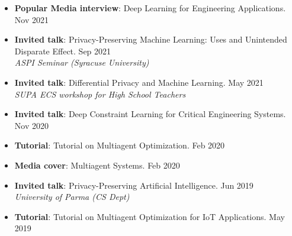 \begin{itemize}
  \item {\bf Popular Media interview}: {Deep Learning for Engineering Applications.} \hfill {Nov 2021}\\ 

  \item \textbf{Invited talk}: Privacy-Preserving Machine Learning: Uses and Unintended Disparate Effect. \hfill Sep 2021\\
  {\em ASPI Seminar (Syracuse University)} 
  
  \item \textbf{Invited talk}: Differential Privacy and Machine Learning. \hfill May 2021\\
  {\em SUPA ECS workshop for High School Teachers}
  

  \item {\bf Invited talk}: Deep Constraint Learning for Critical Engineering Systems. \hfill {Nov 2020}\\
  
  \item {\bf Tutorial}: {Tutorial on Multiagent Optimization.} \hfill {Feb 2020}\\ 
  
  \item {\bf Media cover}: {Multiagent Systems.} \hfill{Feb 2020}\\

  \item {\bf Invited talk}:  Privacy-Preserving Artificial Intelligence. \hfill {Jun 2019}\\
  {\em University of Parma (CS Dept)} 

  \item {\bf Tutorial}: {Tutorial on Multiagent Optimization for IoT Applications.} \hfill {May 2019}\\ 


\end{itemize}
